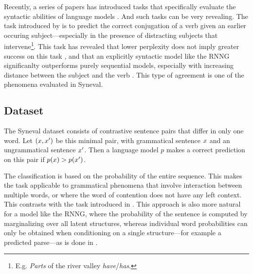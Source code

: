   Recently, a series of papers has introduced tasks that specifically evaluate the syntactic abilities of language models \citep{linzen2016syntax,gulordava2018colorless,linzen2018targeted}. And such tasks can be very revealing. The task introduced by \citet{linzen2016syntax} is to predict the correct conjugation of a verb given an earlier occuring subject---especially in the presence of distracting subjects that intervene\footnote{E.g. \textit{Parts} of the river valley \textit{have}/\textit{has}.}. This task has revealed that lower perplexity does not imply greater success on this task \citep{tran2018recurrent}, and that an explicitly syntactic model like the RNNG significanlty outperforms purely sequential models, especially with increasing distance between the subject and the verb \citep{kuncoro2018learn}. This type of agreement is one of the phenomena evaluated in Syneval.

  \subsection{Dataset}
    The Syneval dataset consists of contrastive sentence pairs that differ in only one word. Let $(x, x')$ be this minimal pair, with grammatical sentence $x$ and an ungrammatical sentence $x'$. Then a language model $p$ makes a correct prediction on this pair if $p(x) > p(x')$.

    The classification is based on the probability of the entire sequence. This makes the task applicable to grammatical phenomena that involve interaction between multiple words, or where the word of contention does not have any left context. This contrasts with the task introduced in \citet{linzen2016syntax}. This approach is also more natural for a model like the RNNG, where the probability of the sentence is computed by marginalizing over all latent structures, whereas individual word probabilities can only be obtained when conditioning on a single structure---for example a predicted parse---as is done in \cite{kuncoro2018learn}.


